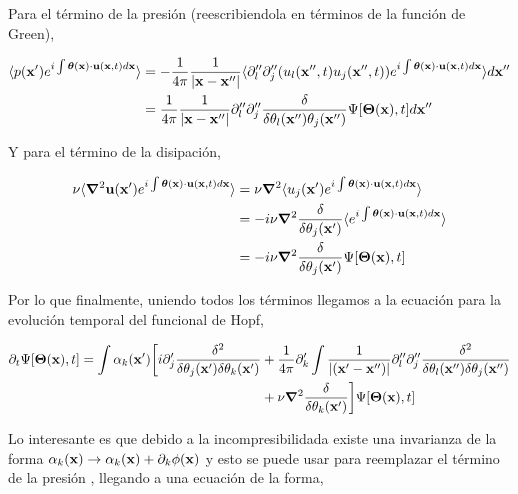 \documentclass[executivepaper,12pt]{article}
\numberwithin{equation}{section}
\providecommand{\abs}[1]{\lvert#1\rvert}
\begin{document}
Para el término de la presión (reescribiendola en términos de la función de Green),

\begin{align*}
	\langle p(\vb{x}') e^{i\int \bm{\theta}(\vb{x})\cdot\vb{u}(\vb{x},t) d\vb{x}} \rangle&=-\frac{1}{4\pi} \frac{1}{\abs{\vb{x}-\vb{x}''}} \langle \partial''_l \partial''_j(u_l(\vb{x}'',t)u_j(\vb{x}'',t)) e^{i\int \bm{\theta}(\vb{x})\cdot\vb{u}(\vb{x},t) d\vb{x}} \rangle d\vb{x}''\\
	&=\frac{1}{4\pi} \frac{1}{\abs{\vb{x}-\vb{x}''}} \partial''_l\partial''_j \frac{\delta }{\delta \theta_l (\vb{x''})\theta_j (\vb{x''})}\Psi [\bm{\Theta}(\vb{x}),t] d\vb{x}''\\
\end{align*}

Y para el término de la disipación, 

\begin{align*}
	\nu \langle \grad{}^2 \vb{u}(\vb{x}') e^{i\int \bm{\theta}(\vb{x})\cdot\vb{u}(\vb{x},t) d\vb{x}}\rangle&= \nu  \grad{}^2 \langle u_j(\vb{x}') e^{i\int \bm{\theta}(\vb{x})\cdot\vb{u}(\vb{x},t) d\vb{x}}\rangle\\
	&=-i\nu  \grad{}^2 \frac{\delta}{\delta\theta_j(\vb{x}')}\langle e^{i\int \bm{\theta}(\vb{x})\cdot\vb{u}(\vb{x},t) d\vb{x}}\rangle\\
	&=-i\nu  \grad{}^2 \frac{\delta}{\delta\theta_j(\vb{x}')}\Psi [\bm{\Theta}(\vb{x}),t]\\
\end{align*}

Por lo que finalmente, uniendo todos los términos llegamos a la ecuación para la evolución temporal del funcional de Hopf,

\begin{align*}
	\partial_t \Psi [\bm{\Theta}(\vb{x}),t] = \int \alpha_k(\vb{x}')\bigg[i\partial'_j \frac{\delta^2}{\delta\theta_j(\vb{x}') \delta\theta_k(\vb{x}')}& +\frac{1}{4\pi}\partial_k'\int \frac{1}{\abs{(\vb{x}'-\vb{x}'')}}\partial''_l\partial''_j \frac{\delta^2}{\delta\theta_l(\vb{x}'') \delta\theta_j(\vb{x}'') } \\&+\nu\grad{}^2 \frac{\delta}{\delta\theta_k(\vb{x}')} \bigg] \Psi [\bm{\Theta}(\vb{x}),t]
\end{align*}

Lo interesante es que debido a la incompresibilidada existe una invarianza de la forma $\alpha_k(\vb{x}) \to \alpha_k(\vb{x})+\partial_k\phi(\vb{x})$ y esto se puede usar para reemplazar el término de la presión \parencite{friedrich2020}, llegando a una ecuación de la forma, 
\end{document}
